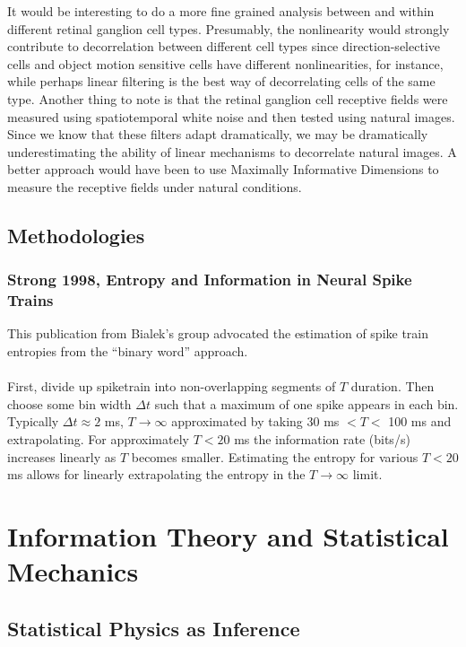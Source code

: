 \documentclass{article}
\begin{document}
It would be interesting to do a more fine grained analysis between and within different retinal ganglion cell types.  Presumably, the nonlinearity would strongly contribute to decorrelation between different cell types since direction-selective cells and object motion sensitive cells have different nonlinearities, for instance, while perhaps linear filtering is the best way of decorrelating cells of the same type.  Another thing to note is that the retinal ganglion cell receptive fields were measured using spatiotemporal white noise and then tested using natural images.  Since we know that these filters adapt dramatically, we may be dramatically underestimating the ability of linear mechanisms to decorrelate natural images.  A better approach would have been to use Maximally Informative Dimensions to measure the receptive fields under natural conditions.
 
 
 
\subsection{Methodologies}
\subsubsection{Strong 1998, Entropy and Information in Neural Spike Trains}
This publication from Bialek's group advocated the estimation of spike train entropies from the ``binary word'' approach.\\
\\
First, divide up spiketrain into non-overlapping segments of $T$ duration. Then choose some bin width $\Delta t$ such that a maximum of one spike appears in each bin.  Typically $\Delta t \approx 2$ ms, $T \to \infty$ approximated by taking 30 ms $< T <$ 100 ms and extrapolating.  For  approximately $T < 20$ ms the information rate (bits/s) increases linearly as $T$ becomes smaller.  Estimating the entropy for various $T < 20$ ms allows for linearly extrapolating the entropy in the $T \to \infty$ limit.



\section{Information Theory and Statistical Mechanics}

\subsection{Statistical Physics as Inference}
\end{document}

